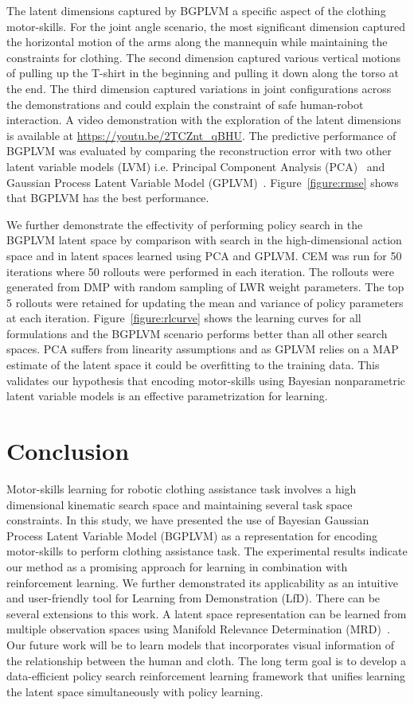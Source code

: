 \documentclass{article}
\begin{document}
The latent dimensions captured by BGPLVM a specific aspect of the clothing motor-skills. For the joint angle scenario, the most significant dimension captured the horizontal motion of the arms along the mannequin while maintaining the constraints for clothing. The second dimension captured various vertical motions of pulling up the T-shirt in the beginning and pulling it down along the torso at the end. The third dimension captured variations in joint configurations across the demonstrations and could explain the constraint of safe human-robot interaction. A video demonstration with the exploration of the latent dimensions is available at \url{https://youtu.be/2TCZnt_qBHU}. The predictive performance of BGPLVM was evaluated by comparing the reconstruction error with two other latent variable models (LVM) i.e. Principal Component Analysis (PCA)~\cite{pca} and Gaussian Process Latent Variable Model (GPLVM)~\cite{gplvm}. Figure~\ref{figure:rmse} shows that BGPLVM has the best performance.

We further demonstrate the effectivity of performing policy search in the BGPLVM latent space by comparison with search in the high-dimensional action space and in latent spaces learned using PCA and GPLVM. CEM was run for 50 iterations where 50 rollouts were performed in each iteration. The rollouts were generated from DMP with random sampling of LWR weight parameters. The top 5 rollouts were retained for updating the mean and variance of policy parameters at each iteration. Figure~\ref{figure:rlcurve} shows the learning curves for all formulations and the BGPLVM scenario performs better than all other search spaces. PCA suffers from linearity assumptions and as GPLVM relies on a MAP estimate of the latent space it could be overfitting to the training data. This validates our hypothesis that encoding motor-skills using Bayesian nonparametric latent variable models is an effective parametrization for learning.

\section{Conclusion}
\label{section:conclusion}

Motor-skills learning for robotic clothing assistance task involves a high dimensional kinematic search space and maintaining several task space constraints. In this study, we have presented the use of Bayesian Gaussian Process Latent Variable Model (BGPLVM) as a representation for encoding motor-skills to perform clothing assistance task. The experimental results indicate our method as a promising approach for learning in combination with reinforcement learning. We further demonstrated its applicability as an intuitive and user-friendly tool for Learning from Demonstration (LfD). There can be several extensions to this work. A latent space representation can be learned from multiple observation spaces using Manifold Relevance Determination (MRD)~\cite{mrd}. Our future work will be to learn models that incorporates visual information of the relationship between the human and cloth. The long term goal is to develop a data-efficient policy search reinforcement learning framework that unifies learning the latent space simultaneously with policy learning.
\end{document}
